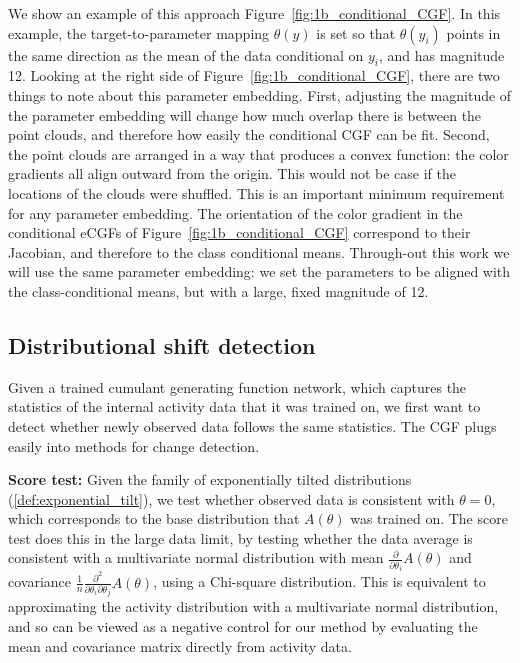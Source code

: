 \documentclass{article}      %
\begin{document}
We show an example of this approach Figure~\ref{fig:1b_conditional_CGF}.
In this example, the target-to-parameter mapping $\theta(y)$ is set so that $\theta(y_i)$ points in the same direction as the mean of the data conditional on $y_i$, and has magnitude 12.
Looking at the right side of Figure~\ref{fig:1b_conditional_CGF}, there are two things to note about this parameter embedding.
First, adjusting the magnitude of the parameter embedding will change how much overlap there is between the point clouds, and therefore how easily the conditional CGF can be fit. 
Second, the point clouds are arranged in a way that produces a convex function: the color gradients all align outward from the origin. 
This would not be case if the locations of the clouds were shuffled. 
This is an important minimum requirement for any parameter embedding.
The orientation of the color gradient in the conditional eCGFs of Figure~\ref{fig:1b_conditional_CGF} correspond to their Jacobian, and therefore to the class conditional means.
Through-out this work we will use the same parameter embedding: we set the parameters to be aligned with the class-conditional means, but with a large, fixed magnitude of 12.


\subsection{Distributional shift detection}
Given a trained cumulant generating function network, which captures the statistics of the internal activity data that it was trained on, we first want to detect whether newly observed data follows the same statistics.
The CGF plugs easily into methods for change detection.

\textbf{Score test:} \cite{cox1979theoretical} 
Given the family of exponentially tilted distributions (\ref{def:exponential_tilt}), we test whether observed data is consistent with $\theta = 0$, which corresponds to the base distribution that $A(\theta)$ was trained on.
The score test does this in the large data limit, by testing whether the data average is consistent with a multivariate normal distribution with mean $\frac{\partial}{\partial \theta_i} A(\theta)$ and covariance $\frac{1}{n}\frac{\partial^2}{\partial \theta_i \partial \theta_j} A(\theta)$, using a Chi-square distribution.
This is equivalent to approximating the activity distribution with a multivariate normal distribution, and so can be viewed as a negative control for our method by evaluating the mean and covariance matrix directly from activity data.
\end{document}
